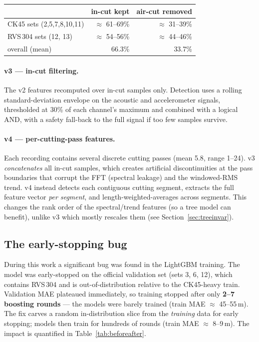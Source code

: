 \documentclass[11pt,a4paper]{article}
\newcommand{\um}{\,\textmu m}
\begin{document}
\begin{center}\small
\begin{tabular}{lrr}
\toprule
 & in-cut kept & air-cut removed \\
\midrule
CK45 sets (2,5,7,8,10,11)   & $\approx$ 61--69\% & $\approx$ 31--39\% \\
RVS\,304 sets (12, 13)      & $\approx$ 54--56\% & $\approx$ 44--46\% \\
\midrule
overall (mean)              & 66.3\%             & 33.7\% \\
\bottomrule
\end{tabular}
\end{center}

\paragraph{v3 --- in-cut filtering.} The v2 features recomputed over in-cut
samples only. Detection uses a rolling standard-deviation envelope on the
acoustic and accelerometer signals, thresholded at 30\% of each channel's
maximum and combined with a logical AND, with a safety fall-back to the full
signal if too few samples survive.

\paragraph{v4 --- per-cutting-pass features.} Each recording contains several
discrete cutting passes (mean 5.8, range 1--24). v3 \emph{concatenates} all
in-cut samples, which creates artificial discontinuities at the pass boundaries
that corrupt the FFT (spectral leakage) and the windowed-RMS trend. v4 instead
detects each contiguous cutting segment, extracts the full feature vector
\emph{per segment}, and length-weighted-averages across segments. This changes
the rank order of the spectral/trend features (so a tree model can benefit),
unlike v3 which mostly rescales them (see Section~\ref{sec:treeinvar}).

\subsection{The early-stopping bug}
\label{sec:bug}
During this work a significant bug was found in the LightGBM training. The
model was early-stopped on the official validation set (sets 3, 6, 12), which
contains RVS\,304 and is out-of-distribution relative to the CK45-heavy train.
Validation MAE plateaued immediately, so training stopped after only
\textbf{2--7 boosting rounds} --- the models were barely trained (train MAE
$\approx$ 45--55\um). The fix carves a random in-distribution slice from the
\emph{training} data for early stopping; models then train for hundreds of
rounds (train MAE $\approx$ 8--9\um). The impact is quantified in
Table~\ref{tab:beforeafter}.
\end{document}
